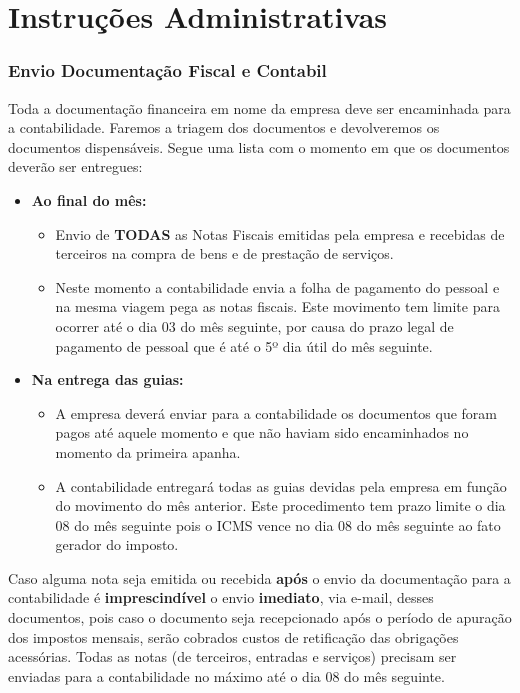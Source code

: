 \documentclass{article}
\newcommand{\pretextual}{
  \cleardoublepage
  \pagenumbering{roman}
}
\newcommand{\textual}{
  \cleardoublepage
  \pagenumbering{arabic}
}
\newcommand{\parte}[1]{
  \pagebreak
  \vfill
  \partfont{\centering}
  \vspace*{\fill}
    \part{#1}    
  \vspace*{\fill}
  \vfill
  \pagebreak
}
\begin{document}
\singlespacing

\pretextual

\tableofcontents
\cleardoublepage

\textual

\parte{Instruções Administrativas}
\section{Envio Documentação Fiscal e Contabil}
\label{sec:doc-fin}
Toda a documentação financeira em nome da empresa deve ser encaminhada para a contabilidade. Faremos a triagem dos documentos e devolveremos os documentos dispensáveis. Segue uma lista com o momento em que os documentos deverão ser entregues:
\begin{itemize}
  \item \textbf{Ao final do mês:}
  \begin{itemize}
    \item Envio de \textbf{TODAS} as Notas Fiscais emitidas pela empresa e recebidas de terceiros na compra de bens e de prestação de serviços.
    \item Neste momento a contabilidade envia a folha de pagamento do pessoal e na mesma viagem pega as notas fiscais. Este movimento tem limite para ocorrer até o dia 03 do mês seguinte, por causa do prazo legal de pagamento de pessoal que é até o 5º dia útil do mês seguinte.
  \end{itemize}
  \item \textbf{Na entrega das guias:}
  \begin{itemize}
    \item A empresa deverá enviar para a contabilidade os documentos que foram pagos até aquele momento e que não haviam sido encaminhados no momento da primeira apanha.
    \item A contabilidade entregará todas as guias devidas pela empresa em função do movimento do mês anterior. Este procedimento tem prazo limite o dia 08 do mês seguinte pois o ICMS vence no dia 08 do mês seguinte ao fato gerador do imposto.
  \end{itemize}
\end{itemize}

\begin{tcolorbox}[title=Atenção!]
  Caso alguma nota seja emitida ou recebida \textbf{após} o envio da documentação para a contabilidade é \textbf{imprescindível} o envio \textbf{imediato}, via e-mail, desses documentos, pois caso o documento seja recepcionado após o período de apuração dos impostos mensais, serão cobrados custos de retificação das obrigações acessórias. Todas as notas (de terceiros, entradas e serviços) precisam ser enviadas para a contabilidade no máximo até o dia 08 do mês seguinte.
\end{tcolorbox}
\end{document}
